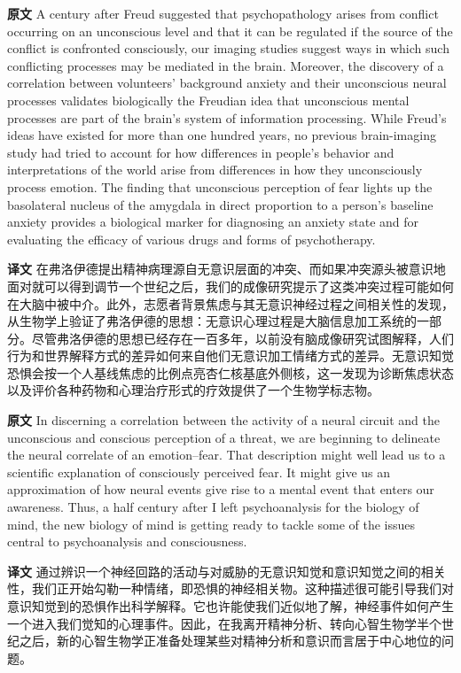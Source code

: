 \documentclass[UTF8,zihao=-4]{ctexart}
\newcommand{\BodyFont}{\fontsize{10.5pt}{15.5pt}\selectfont}
\newcommand{\origlabel}{\textbf{原文}\quad}
\newcommand{\translabel}{\textbf{译文}\quad}
\newenvironment{enblock}{\par\noindent\begingroup\BodyFont\origlabel}{\par\endgroup}
\newenvironment{zhblock}{\par\noindent\begingroup\BodyFont\translabel}{\par\endgroup\vspace{0.35em}}
\begin{document}
\begin{enblock}
A century after Freud suggested that psychopathology arises from conflict occurring on an unconscious level and that it can be regulated if the source of the conflict is confronted consciously, our imaging studies suggest ways in which such conflicting processes may be mediated in the brain. Moreover, the discovery of a correlation between volunteers' background anxiety and their unconscious neural processes validates biologically the Freudian idea that unconscious mental processes are part of the brain's system of information processing. While Freud's ideas have existed for more than one hundred years, no previous brain-imaging study had tried to account for how differences in people's behavior and interpretations of the world arise from differences in how they unconsciously process emotion. The finding that unconscious perception of fear lights up the basolateral nucleus of the amygdala in direct proportion to a person's baseline anxiety provides a biological marker for diagnosing an anxiety state and for evaluating the efficacy of various drugs and forms of psychotherapy.
\end{enblock}
\begin{zhblock}
在弗洛伊德提出精神病理源自无意识层面的冲突、而如果冲突源头被意识地面对就可以得到调节一个世纪之后，我们的成像研究提示了这类冲突过程可能如何在大脑中被中介。此外，志愿者背景焦虑与其无意识神经过程之间相关性的发现，从生物学上验证了弗洛伊德的思想：无意识心理过程是大脑信息加工系统的一部分。尽管弗洛伊德的思想已经存在一百多年，以前没有脑成像研究试图解释，人们行为和世界解释方式的差异如何来自他们无意识加工情绪方式的差异。无意识知觉恐惧会按一个人基线焦虑的比例点亮杏仁核基底外侧核，这一发现为诊断焦虑状态以及评价各种药物和心理治疗形式的疗效提供了一个生物学标志物。\end{zhblock}

\begin{enblock}
In discerning a correlation between the activity of a neural circuit and the unconscious and conscious perception of a threat, we are beginning to delineate the neural correlate of an emotion--fear. That description might well lead us to a scientific explanation of consciously perceived fear. It might give us an approximation of how neural events give rise to a mental event that enters our awareness. Thus, a half century after I left psychoanalysis for the biology of mind, the new biology of mind is getting ready to tackle some of the issues central to psychoanalysis and consciousness.
\end{enblock}
\begin{zhblock}
通过辨识一个神经回路的活动与对威胁的无意识知觉和意识知觉之间的相关性，我们正开始勾勒一种情绪，即恐惧的神经相关物。这种描述很可能引导我们对意识知觉到的恐惧作出科学解释。它也许能使我们近似地了解，神经事件如何产生一个进入我们觉知的心理事件。因此，在我离开精神分析、转向心智生物学半个世纪之后，新的心智生物学正准备处理某些对精神分析和意识而言居于中心地位的问题。\end{zhblock}
\end{document}
